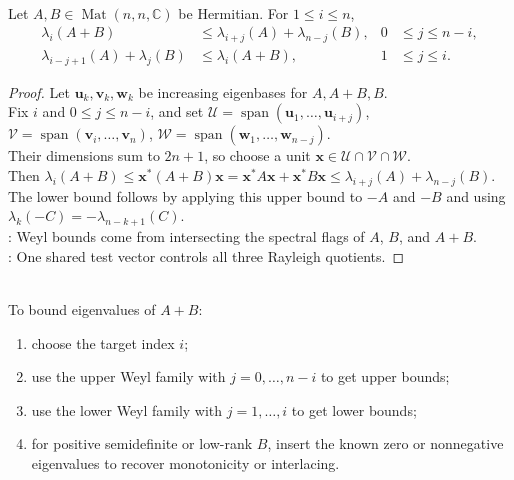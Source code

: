 \begin{theorem} \label{thm:weyl-eigenvalue-inequalities-hermitian-sums} \\
Let $A,B\in\operatorname{Mat}(n,n,\mathbb{C})$ be Hermitian. For $1\leq i\leq n$,
\begin{align*}
\lambda_i(A+B) &\leq \lambda_{i+j}(A)+\lambda_{n-j}(B),
& 0 &\leq j\leq n-i,\\
\lambda_{i-j+1}(A)+\lambda_j(B) &\leq \lambda_i(A+B),
& 1 &\leq j\leq i.
\end{align*}
\begin{proof}
Let $\mathbf{u}_k,\mathbf{v}_k,\mathbf{w}_k$ be increasing eigenbases for $A,A+B,B$.\\
Fix $i$ and $0\leq j\leq n-i$, and set $\mathcal{U}=\operatorname{span}(\mathbf{u}_1,\ldots,\mathbf{u}_{i+j})$, $\mathcal{V}=\operatorname{span}(\mathbf{v}_i,\ldots,\mathbf{v}_n)$, $\mathcal{W}=\operatorname{span}(\mathbf{w}_1,\ldots,\mathbf{w}_{n-j})$.\\
Their dimensions sum to $2n+1$, so choose a unit $\mathbf{x}\in\mathcal{U}\cap\mathcal{V}\cap\mathcal{W}$.\\
Then $\lambda_i(A+B)\leq \mathbf{x}^*(A+B)\mathbf{x} =\mathbf{x}^*A\mathbf{x}+\mathbf{x}^*B\mathbf{x} \leq \lambda_{i+j}(A)+\lambda_{n-j}(B)$.\\
The lower bound follows by applying this upper bound to $-A$ and $-B$ and using $\lambda_k(-C)=-\lambda_{n-k+1}(C)$.\\
: Weyl bounds come from intersecting the spectral flags of $A$, $B$, and $A+B$.\\
: One shared test vector controls all three Rayleigh quotients.
\end{proof}
\end{theorem}

\begin{method} \label{meth:weyl-inequality-method} \\
To bound eigenvalues of $A+B$:
\begin{enumerate}[label=(\roman*)]
\setlength{\itemsep}{0pt}
\item choose the target index $i$;
\item use the upper Weyl family with $j=0,\ldots,n-i$ to get upper bounds;
\item use the lower Weyl family with $j=1,\ldots,i$ to get lower bounds;
\item for positive semidefinite or low-rank $B$, insert the known zero or nonnegative eigenvalues to recover monotonicity or interlacing.
\end{enumerate}
\end{method}

